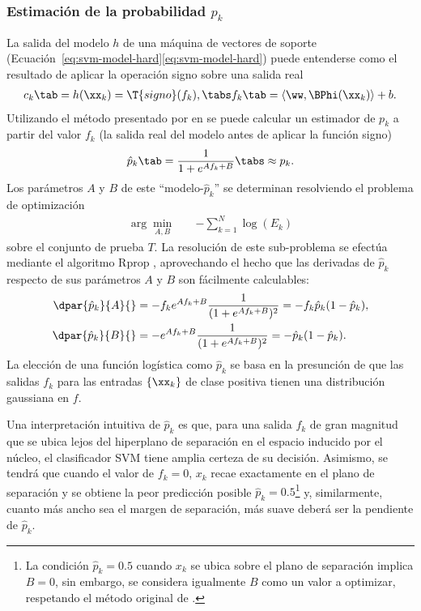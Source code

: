 %
\subsubsection{Estimación de la probabilidad ${p}_k$}
%
La salida del modelo $h$ de una máquina de vectores de soporte
(\iflatexml{}Ecuación~\ref{eq:svm-model-hard}\else\autoref{eq:svm-model-hard}\fi)
puede entenderse como el resultado de aplicar la operación signo sobre
una salida real
%
\begin{align}
\label{e3:svm-model-as-sign-fk}
  c_k \tab= h(\xx_k) = \T{signo}(f_k),\tabs
  f_k\tab=\langle\ww,\BPhi(\xx_k)\rangle+b.
\end{align}
%
Utilizando el método presentado por \citeauthor{platt} en \cite{platt}
se puede calcular un estimador de $p_k$ a partir del valor $f_k$ (la
salida real del modelo antes de aplicar la función signo)
%
\begin{align}
\label{e3:pk-hat}
  \hat{p}_k\tab=\frac{1}{1+e^{Af_k+B}} \tabs \approx p_k.
\end{align}
%
Los parámetros $A$ y $B$ de este ``modelo-$\hat{p}_k$'' se determinan
resolviendo el problema de optimización
%
\begin{align}
  \arg\min_{A,B} \quad & -\sum_{k=1}^{N} \log(E_k)
  \label{abproblem}
\end{align}
%
sobre el conjunto de prueba $T$. La resolución de este
sub-problema se efectúa mediante el algoritmo Rprop \cite{rprop},
aprovechando el hecho que las derivadas de $\hat{p}_k$
respecto de sus parámetros $A$ y $B$ son fácilmente calculables:
%
\begin{align}
  \begin{split}
    \dpar{\hat{p}_k}{A}{}&=-f_k e^{Af_k+B}\frac{1}{(1+e^{Af_k+B})^2}
    =-f_k\hat{p}_k(1-\hat{p}_k),\\
    \dpar{\hat{p}_k}{B}{}&=    -e^{Af_k+B}\frac{1}{(1+e^{Af_k+B})^2}
    =-   \hat{p}_k(1-\hat{p}_k).
  \end{split}
\label{e3:deriv-pk-wrt-AB}
\end{align}
%
La elección de una función logística como $\hat{p}_k$ se basa en la
presunción de que las salidas $f_k$ para las entradas $\{\xx_k\}$ de
clase positiva tienen una distribución gaussiana en $f$.

Una interpretación intuitiva de $\hat{p}_k$ es que, para una salida
$f_k$ de gran magnitud que se ubica lejos del hiperplano de separación
en el espacio inducido por el núcleo, el clasificador SVM tiene amplia
certeza de su decisión.  Asimismo, se tendrá que cuando el valor de
$f_k=0$, $x_k$ recae exactamente en el plano de separación y se
obtiene la peor predicción posible $\hat{p}_k=0.5$\footnote{La
  condición $\hat{p}_k=0.5$ cuando $x_k$ se ubica sobre el plano de
  separación implica $B=0$, sin embargo, se considera igualmente $B$
  como un valor a optimizar, respetando el método original de
  \cite{platt}.} y, similarmente, cuanto más ancho sea el margen de
separación, más suave deberá ser la pendiente de $\hat{p}_k$.
